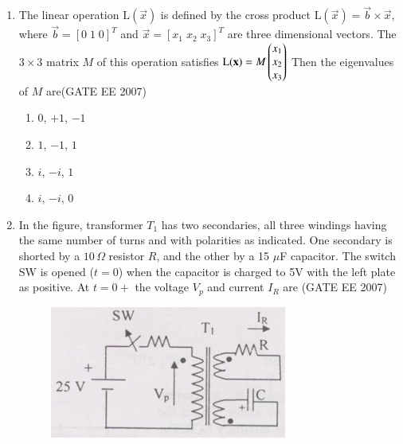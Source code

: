 \documentclass[a4paper,10pt]{exam}
\theoremstyle{remark}
\begin{document}
\begin{enumerate}
\item  \quad The linear operation $\mathrm{L}(\vec{x})$ is defined by the cross product $\mathrm{L}(\vec{x}) = \vec{b} \times \vec{x}$, where $\vec{b} = [0\;1\;0]^T$ and $\vec{x} = [x_1\;x_2\;x_3]^T$ are three dimensional vectors. The $3 \times 3$ matrix $M$ of this operation satisfies
$
    \mathrm{L}(\mathbf{x}) = M \begin{pmatrix}
        x_1 \\
        x_2 \\
        x_3
    \end{pmatrix}
$
Then the eigenvalues of $M$ are\hfill{(GATE EE 2007)} 

\begin{enumerate}
    \item $0$, $+1$, $-1$
    \item $1$, $-1$, $1$
    \item $i$, $-i$, $1$
    \item $i$, $-i$, $0$
\end{enumerate}

\vfill
{}
\newpage

\item  \quad In the figure, transformer $T_1$ has two secondaries, all three windings having the same number of turns and with polarities as indicated. One secondary is shorted by a $10\,\Omega$ resistor $R$, and the other by a 15 $\mu$F capacitor. The switch SW is opened ($t=0$) when the capacitor is charged to 5V with the left plate as positive. At $t=0+$ the voltage $V_p$ and current $I_R$ are
\hfill{(GATE EE 2007)} 

\begin{figure}[H]
    \centering
    \includegraphics[width=0.5\linewidth]{figs/Q 57 2007.png} \caption{}     \label{fig:myfigure}
\end{figure}


\end{enumerate}
\end{document}

